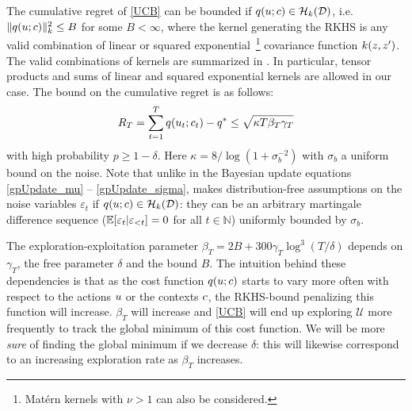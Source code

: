The cumulative regret of \eqref{UCB} can be bounded if $q(u; c) \in \mathcal{H}_k(\mathcal{D})$, i.e. $\|q(u; c)\|_{k}^{2} \leq B$ for some $B < \infty$, where the kernel generating the RKHS is any valid combination of linear or squared exponential~\footnote{Mat\'{e}rn kernels with $\nu > 1$ can also be considered.} covariance function $k(z,z')$. The valid combinations of kernels are summarized in \cite{Bishop07}. In particular, tensor products and sums of linear and squared exponential kernels are allowed in our case. The bound on the cumulative regret is as follows:
\begin{align}
R_T = \sum_{t=1}^{T}q(u_{t}; c_{t}) - q^{*} \leq \sqrt{\kappa T \beta_{T} \gamma_{T}} \label{cum-regret}
\end{align}
with high probability $p \geq 1- \delta$. Here $\kappa = 8/\log(1 + \sigma_b^{-2})$ with $\sigma_b$ a uniform bound on the noise. Note that unlike in the Bayesian update equations \eqref{gpUpdate_mu} -- \eqref{gpUpdate_sigma}, \cite{Krause11} makes distribution-free assumptions on the noise variables $\varepsilon_t$ if $q(u; c) \in \mathcal{H}_k(\mathcal{D})$: they can be an arbitrary martingale difference sequence ($\mathbb{E}[\varepsilon_t|\boldmath{\varepsilon_{<t}}] = 0$ for all $t \in \mathbb{N}$) uniformly bounded by $\sigma_b$. 

The exploration-exploitation parameter $\beta_T = 2B + 300\gamma_{T}\log^{3}(T/\delta)$ depends on $\gamma_T$, the free parameter $\delta$ and the bound $B$. The intuition behind these dependencies is that as the cost function $q(u;c)$ starts to vary more often with respect to the actions $u$ or the contexts $c$, the RKHS-bound penalizing this function will increase. $\beta_T$ will increase and \eqref{UCB} will end up exploring $\mathcal{U}$ more frequently to track the global minimum of this cost function. We will be more \emph{sure} of finding the global minimum if we decrease $\delta$: this will likewise correspond to an increasing exploration rate as $\beta_T$ increases.